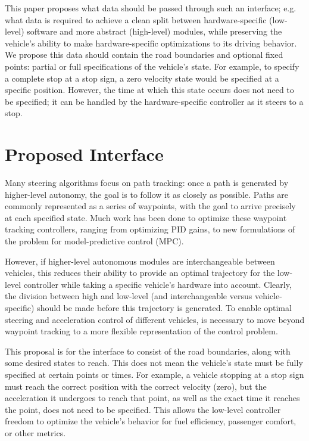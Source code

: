 \documentclass{article}
\begin{document}
This paper proposes what data should be passed through such an interface; e.g. what data is required to achieve a clean split between hardware-specific (low-level) software and more abstract (high-level) modules, while preserving the vehicle's ability to make hardware-specific optimizations to its driving behavior.
We propose this data should contain the road boundaries and optional fixed points: partial or full specifications of the vehicle's state. For example, to specify a complete stop at a stop sign, a zero velocity state would be specified at a specific position. However, the time at which this state occurs does not need to be specified; it can be handled by the hardware-specific controller as it steers to a stop.

%


\section*{Proposed Interface}
Many steering algorithms focus on path tracking: once a path is generated by higher-level autonomy, the goal is to follow it as closely as possible. Paths are commonly represented as a series of waypoints, with the goal to arrive precisely at each specified state. Much work has been done to optimize these waypoint tracking controllers, ranging from optimizing PID gains, to new formulations of the problem for model-predictive control (MPC). %

However, if higher-level autonomous modules are interchangeable between vehicles, this reduces their ability to provide an optimal trajectory for the low-level controller while taking a specific vehicle's hardware into account. Clearly, the division between high and low-level (and interchangeable versus vehicle-specific) should be made before this trajectory is generated. To enable optimal steering and acceleration control of different vehicles, is necessary to move beyond waypoint tracking to a more flexible representation of the control problem.

This proposal is for the interface to consist of the road boundaries, along with some desired states to reach. This does not mean the vehicle's state must be fully specified at certain points or times. For example, a vehicle stopping at a stop sign must reach the correct position with the correct velocity (zero), but the acceleration it undergoes to reach that point, as well as the exact time it reaches the point, does not need to be specified. This allows the low-level controller freedom to optimize the vehicle's behavior for fuel efficiency, passenger comfort, or other metrics.
\end{document}
